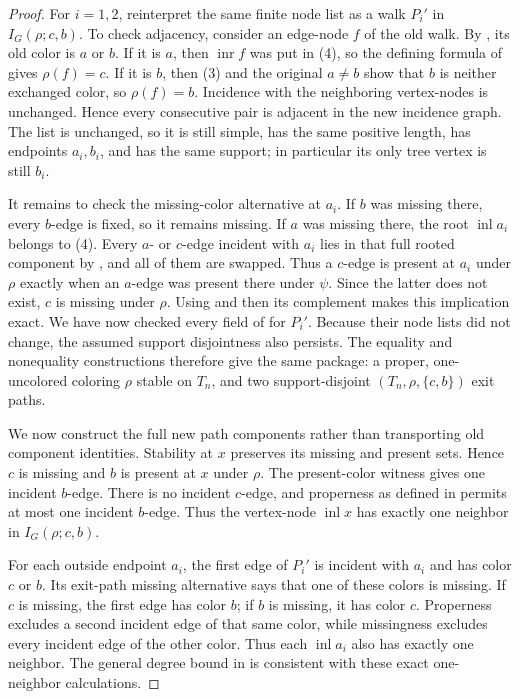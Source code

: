 \begin{proof}
For $i=1,2$, reinterpret the same finite node list as a walk $P_i'$ in
$I_G(\rho;c,b)$.  To check adjacency, consider an edge-node $f$ of the
old walk.  By , its old color is $a$ or
$b$.  If it is $a$, then $\operatorname{inr}f$ was put in (4), so the
defining formula of  gives
$\rho(f)=c$.  If it is $b$, then (3) and the original $a\ne b$ show that
$b$ is neither exchanged color, so $\rho(f)=b$.  Incidence with the
neighboring vertex-nodes is unchanged.  Hence every consecutive pair is
adjacent in the new incidence graph.  The list is unchanged, so it is
still simple, has the same positive length, has endpoints $a_i,b_i$, and
has the same support; in particular its only tree vertex is still $b_i$.

It remains to check the missing-color alternative at $a_i$.  If $b$ was
missing there, every $b$-edge is fixed, so it remains missing.  If $a$
was missing there, the root $\operatorname{inl}a_i$ belongs to (4).
Every $a$- or $c$-edge incident with $a_i$ lies in that full rooted
component by , and all of them are swapped.
Thus a $c$-edge is present at $a_i$ under $\rho$ exactly when an $a$-edge
was present there under $\psi$.  Since the latter does not exist, $c$ is
missing under $\rho$.  Using  and then its
complement  makes this implication exact.  We
have now checked every field of  for $P_i'$.
Because their node lists did not change, the assumed support disjointness
also persists.  The equality and nonequality constructions therefore
give the same package: a proper, one-uncolored coloring $\rho$ stable on
$T_n$, and two support-disjoint $(T_n,\rho,\{c,b\})$ exit paths.

We now construct the full new path components rather than transporting
old component identities.  Stability at $x$ preserves its missing and
present sets.  Hence $c$ is missing and $b$ is present at $x$ under
$\rho$.  The present-color witness gives one incident $b$-edge.  There is
no incident $c$-edge, and properness as defined in
 permits at most one incident $b$-edge.
Thus the vertex-node $\operatorname{inl}x$ has exactly one neighbor in
$I_G(\rho;c,b)$.

For each outside endpoint $a_i$, the first edge of $P_i'$ is incident
with $a_i$ and has color $c$ or $b$.  Its exit-path missing alternative
says that one of these colors is missing.  If $c$ is missing, the first
edge has color $b$; if $b$ is missing, it has color $c$.  Properness
excludes a second incident edge of that same color, while missingness
excludes every incident edge of the other color.  Thus each
$\operatorname{inl}a_i$ also has exactly one neighbor.  The general
degree bound in  is consistent
with these exact one-neighbor calculations.


\end{proof}
